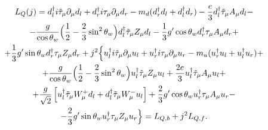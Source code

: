 \begin{multline}


L_Q(j)=d_{l}^{\dagger}i\tilde{\tau}_{\mu}\partial_{\mu}d_{l}

+d_r^{\dagger}i\tau_{\mu}\partial_{\mu}d_r

-m_d(d_r^{\dagger}d_{l} + d_{l}^{\dagger}d_r)

-\frac{e}{3}d_{l}^{\dagger}\tilde{\tau}_{\mu}A_{\mu}d_{l} -

\\

-\frac{g}{\cos \theta_w}\Bigl(\frac{1}{2}-

\frac{2}{3}\sin^2\theta_w\Bigr) d_{l}^{\dagger}\tilde{\tau}_{\mu}Z_{\mu}d_{l} %



 -\frac{1}{3}g'\cos\theta_w d_r^{\dagger}\tau_{\mu}A_{\mu}d_r +

\\

+\frac{1}{3}g'\sin\theta_w d_r^{\dagger}\tau_{\mu}Z_{\mu}d_r %

+j^2\Bigl\{ u_{l}^{\dagger}i\tilde{\tau}_{\mu}\partial_{\mu}u_{l}

+u_r^{\dagger}i\tau_{\mu}\partial_{\mu}u_r

-m_u(u_r^{\dagger}u_{l} + u_{l}^{\dagger}u_r) +

\\

+\frac{g}{\cos \theta_w}\Bigl(\frac{1}{2}-\frac{2}{3}\sin^2\theta_w\Bigr) u_{l}^{\dagger}\tilde{\tau}_{\mu}Z_{\mu}u_{l} %

+\frac{2e}{3}u_{l}^{\dagger}\tilde{\tau}_{\mu}A_{\mu}u_{l} +

\\

+\frac{g}{\sqrt{2}}\left[ u_{l}^{\dagger}\tilde{\tau}_{\mu}W^{+}_{\mu}d_{l} +

d_{l}^{\dagger}\tilde{\tau}_{\mu}W^{-}_{\mu}u_{l}\right] %

+\frac{2}{3}g'\cos\theta_w u_r^{\dagger}\tau_{\mu}A_{\mu}u_r -

\\

-\frac{2}{3}g'\sin\theta_w u_r^{\dagger}\tau_{\mu}Z_{\mu}u_r

\Bigr\}

=L_{Q,b} + j^2 L_{Q,f}.

\label{gr:eq:QL}

\end{multline}


